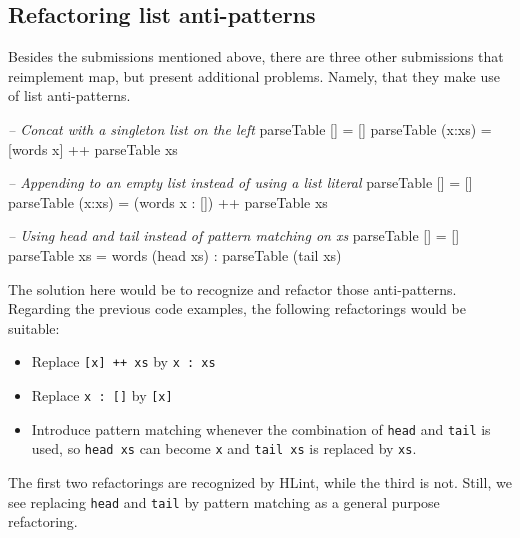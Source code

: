 \documentclass[a4paperpaper,]{report}
\newenvironment{Shaded}{}{}
\newcommand{\CommentTok}[1]{\textcolor[rgb]{0.38,0.63,0.69}{\textit{#1}}}
\newcommand{\FunctionTok}[1]{\textcolor[rgb]{0.02,0.16,0.49}{#1}}
\newcommand{\NormalTok}[1]{#1}
\providecommand{\tightlist}{%
  \setlength{\itemsep}{0pt}\setlength{\parskip}{0pt}}
\begin{document}
\hypertarget{refactoring-list-anti-patterns}{%
\subsection{Refactoring list
anti-patterns}\label{refactoring-list-anti-patterns}}

Besides the submissions mentioned above, there are three other
submissions that reimplement map, but present additional problems.
Namely, that they make use of list anti-patterns.

\begin{Shaded}
\begin{Highlighting}[]
\CommentTok{-- Concat with a singleton list on the left}
\NormalTok{parseTable [] }\FunctionTok{=}\NormalTok{ []}
\NormalTok{parseTable (x}\FunctionTok{:}\NormalTok{xs) }\FunctionTok{=}\NormalTok{ [words x] }\FunctionTok{++}\NormalTok{ parseTable xs}

\CommentTok{-- Appending to an empty list instead of using a list literal}
\NormalTok{parseTable [] }\FunctionTok{=}\NormalTok{ []}
\NormalTok{parseTable (x}\FunctionTok{:}\NormalTok{xs) }\FunctionTok{=}\NormalTok{ (words x }\FunctionTok{:}\NormalTok{ []) }\FunctionTok{++}\NormalTok{ parseTable xs}

\CommentTok{-- Using head and tail instead of pattern matching on xs}
\NormalTok{parseTable [] }\FunctionTok{=}\NormalTok{ []}
\NormalTok{parseTable xs }\FunctionTok{=}\NormalTok{ words (head xs) }\FunctionTok{:}\NormalTok{ parseTable (tail xs)}
\end{Highlighting}
\end{Shaded}

The solution here would be to recognize and refactor those
anti-patterns. Regarding the previous code examples, the following
refactorings would be suitable:

\begin{itemize}
\tightlist
\item
  Replace \texttt{{[}x{]}\ ++\ xs} by \texttt{x\ :\ xs}
\item
  Replace \texttt{x\ :\ {[}{]}} by \texttt{{[}x{]}}
\item
  Introduce pattern matching whenever the combination of \texttt{head}
  and \texttt{tail} is used, so \texttt{head\ xs} can become \texttt{x}
  and \texttt{tail\ xs} is replaced by \texttt{xs}.
\end{itemize}

The first two refactorings are recognized by HLint, while the third is
not. Still, we see replacing \texttt{head} and \texttt{tail} by pattern
matching as a general purpose refactoring.
\end{document}
